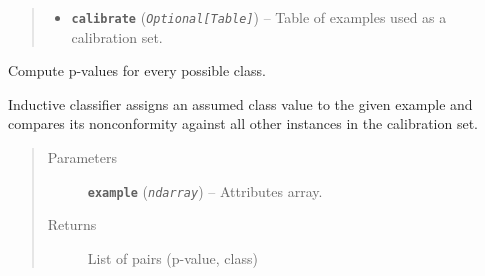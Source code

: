 \documentclass[letterpaper,10pt,english]{sphinxmanual}
\begin{document}
\begin{fulllineitems}
\begin{fulllineitems}
\begin{quote}
\begin{description}
\begin{itemize}
\item {} 
\textbf{\texttt{calibrate}} (\emph{\texttt{Optional{[}Table{]}}}) -- Table of examples used as a calibration set.

\end{itemize}

\end{description}\end{quote}

\end{fulllineitems}


\begin{fulllineitems}
\label{cp.classification:cp.classification.InductiveClassifier.p_values}
Compute p-values for every possible class.

Inductive classifier assigns an assumed class value to the given example and compares its nonconformity
against all other instances in the calibration set.
\begin{quote}\begin{description}
\item[{Parameters}] \leavevmode
\textbf{\texttt{example}} (\emph{\texttt{ndarray}}) -- Attributes array.

\item[{Returns}] \leavevmode
List of pairs (p-value, class)

\end{description}\end{quote}

\end{fulllineitems}


\end{fulllineitems}

\end{document}
